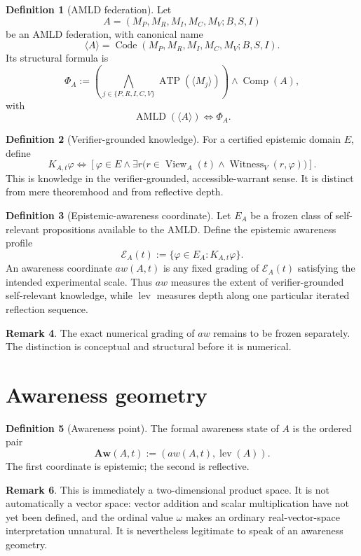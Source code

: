 \documentclass[11pt]{article}
\theoremstyle{definition}
\newtheorem{definition}{Definition}[section]
\newtheorem{remark}[definition]{Remark}
\theoremstyle{plain}
\newcommand{\lev}{\operatorname{lev}}
\newcommand{\ATP}{\operatorname{ATP}}
\newcommand{\AMLD}{\operatorname{AMLD}}
\newcommand{\Comp}{\operatorname{Comp}}
\newcommand{\View}{\operatorname{View}}
\newcommand{\Witness}{\operatorname{Witness}}
\newcommand{\Aw}{\mathbf{Aw}}
\begin{document}
\begin{definition}[AMLD federation]
Let
\[
A=(M_P,M_R,M_I,M_C,M_V;B,S,I)
\]
be an AMLD federation, with canonical name
\[
\langle A\rangle=\operatorname{Code}(M_P,M_R,M_I,M_C,M_V;B,S,I).
\]
Its structural formula is
\[
\Phi_A:=\left(\bigwedge_{j\in\{P,R,I,C,V\}}\ATP(\langle M_j\rangle)\right)\wedge\Comp(A),
\]
with
\[
\AMLD(\langle A\rangle)\Longleftrightarrow\Phi_A.
\]
\end{definition}

\begin{definition}[Verifier-grounded knowledge]
For a certified epistemic domain $E$, define
\[
K_{A,t}\varphi\Longleftrightarrow
\left[\varphi\in E\wedge\exists r\bigl(r\in\View_A(t)\wedge\Witness_V(r,\varphi)\bigr)\right].
\]
This is knowledge in the verifier-grounded, accessible-warrant sense. It is distinct from mere theoremhood and from reflective depth.
\end{definition}

\begin{definition}[Epistemic-awareness coordinate]
Let $E_A$ be a frozen class of self-relevant propositions available to the AMLD. Define the epistemic awareness profile
\[
\mathcal E_A(t):=\{\varphi\in E_A:K_{A,t}\varphi\}.
\]
An awareness coordinate $aw(A,t)$ is any fixed grading of $\mathcal E_A(t)$ satisfying the intended experimental scale. Thus $aw$ measures the extent of verifier-grounded self-relevant knowledge, while $\lev$ measures depth along one particular iterated reflection sequence.
\end{definition}

\begin{remark}
The exact numerical grading of $aw$ remains to be frozen separately. The distinction is conceptual and structural before it is numerical.
\end{remark}

\section{Awareness geometry}

\begin{definition}[Awareness point]
The formal awareness state of $A$ is the ordered pair
\[
\Aw(A,t):=(aw(A,t),\lev(A)).
\]
The first coordinate is epistemic; the second is reflective.
\end{definition}

\begin{remark}
This is immediately a two-dimensional product space. It is not automatically a vector space: vector addition and scalar multiplication have not yet been defined, and the ordinal value $\omega$ makes an ordinary real-vector-space interpretation unnatural. It is nevertheless legitimate to speak of an awareness geometry.
\end{remark}
\end{document}
